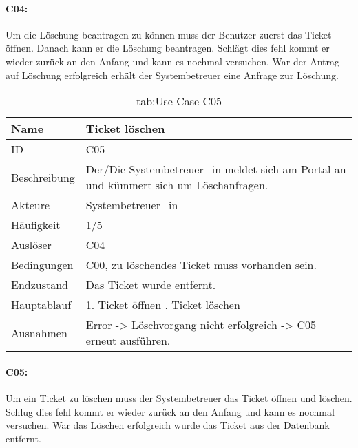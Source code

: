 \paragraph{C04:}
Um die Löschung beantragen zu können muss der Benutzer zuerst das Ticket öffnen. Danach kann er die Löschung beantragen. Schlägt dies fehl kommt er wieder zurück an den Anfang und kann es nochmal versuchen. War der Antrag auf Löschung erfolgreich erhält der Systembetreuer eine Anfrage zur Löschung.

\newpage
\begin{table}[h]
	\begin{tabular}{|p{3cm}|p{10.7cm}|}
		\hline
		Name & Ticket löschen\\
		\hline
		ID & C05\\
		\hline
		Beschreibung & Der/Die Systembetreuer\_in meldet sich am Portal an und kümmert sich um Löschanfragen.\\
		\hline
		Akteure & Systembetreuer\_in\\
		\hline
		Häufigkeit & 1/5\\
		\hline
		Auslöser & C04\\
		\hline
		Bedingungen & C00, zu löschendes Ticket muss vorhanden sein.\\
		\hline
		Endzustand & Das Ticket wurde entfernt.\\
		\hline
		Hauptablauf & 1. Ticket öffnen \newline2. Ticket löschen\\
		\hline
		Ausnahmen & Error -> Löschvorgang nicht erfolgreich -> C05 erneut ausführen.\\
		\hline
	\end{tabular}
	\caption{tab:Use-Case C05}
\end{table}
\label{tab:tab:Use-Case C05}

\paragraph{C05:}
Um ein Ticket zu löschen muss der Systembetreuer das Ticket öffnen und löschen. Schlug dies fehl kommt er wieder zurück an den Anfang und kann es nochmal versuchen. War das Löschen erfolgreich wurde das Ticket aus der Datenbank entfernt.

